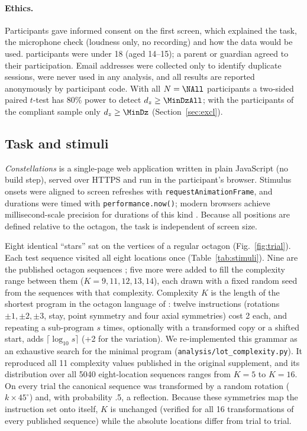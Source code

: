 \documentclass[11pt,a4paper]{article}
\begin{document}
\paragraph{Ethics.} Participants gave informed consent on the first screen, which explained the task, the microphone check
(loudness only, no recording) and how the data would be used. \NMinors{} participants were under 18 (aged 14--15); a parent or
guardian agreed to their participation. Email addresses were collected only to identify duplicate sessions, were never used in
any analysis, and all results are reported anonymously by participant code. With all $N = \NAll$ participants a two-sided paired
$t$-test has 80\% power to detect $d_z \geq \MinDzAll$; with the \NFinal{} participants of the compliant sample only
$d_z \geq \MinDz$ (Section~\ref{sec:excl}).

\subsection{Task and stimuli}
\emph{Constellations} is a single-page web application written in plain JavaScript (no build step), served over HTTPS and run in
the participant's browser. Stimulus onsets were aligned to screen refreshes with \texttt{requestAnimationFrame}, and durations
were timed with \texttt{performance.now()}; modern browsers achieve millisecond-scale precision for durations of this kind
\citep{bridges2020timing}. Because all positions are defined relative to the octagon, the task is independent of screen size.

Eight identical ``stars'' sat on the vertices of a regular octagon (Fig.~\ref{fig:trial}). Each test sequence visited all
eight locations once (Table~\ref{tab:stimuli}). Nine are the published octagon sequences \citep{amalric2017language,alroumi2021mental};
five more were added to fill the complexity range between them ($K = 9, 11, 12, 13, 14$), each drawn with a fixed random seed from
the sequences with that complexity. Complexity $K$ is the length of the shortest program in the octagon language of
\citet{amalric2017language}: twelve instructions (rotations $\pm1,\pm2,\pm3$, stay, point symmetry and four axial symmetries) cost 2
each, and repeating a sub-program $s$ times, optionally with a transformed copy or a shifted start, adds $\lceil\log_{10}s\rceil$
(+2 for the variation). We re-implemented this grammar as an exhaustive search for the minimal program
(\texttt{analysis/lot\_complexity.py}). It reproduced all 11 complexity values published in the original supplement, and its
distribution over all 5040 eight-location sequences ranges from $K = 5$ to $K = 16$. On every trial the canonical sequence was
transformed by a random rotation ($k \times 45^\circ$) and, with probability .5, a reflection. Because these symmetries map the
instruction set onto itself, $K$ is unchanged (verified for all 16 transformations of every published sequence) while the
absolute locations differ from trial to trial.
\end{document}
